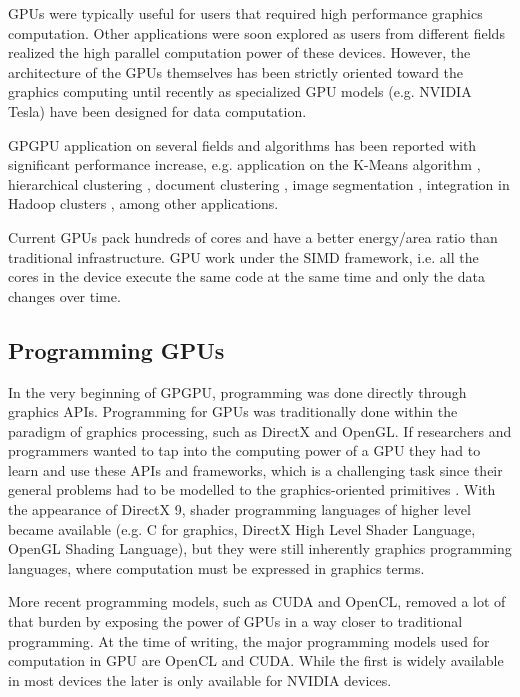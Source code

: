 GPUs were typically useful for users that required high performance graphics computation.
Other applications were soon explored as users from different fields realized the high parallel computation power of these devices.
However, the architecture of the GPUs themselves has been strictly oriented toward the graphics computing until recently as specialized GPU models (e.g. NVIDIA Tesla) have been designed for data computation.

GPGPU application on several fields and algorithms has been reported with significant performance increase, e.g. application on the K-Means algorithm \cite{Bai2009,Wu2011,Zechner2009,Wu2009a}, hierarchical clustering \cite{Shalom2009,ArulShalom2011}, document clustering \cite{gao20xx}, image segmentation \cite{Sirotkovi2012}, integration in Hadoop clusters \cite{Malakar2013,Grossman2013}, among other applications.

Current GPUs pack hundreds of cores and have a better energy/area ratio than traditional infrastructure.
GPU work under the SIMD framework, i.e. all the cores in the device execute the same code at the same time and only the data changes over time.

\subsection{Programming GPUs}

In the very beginning of GPGPU, programming was done directly through graphics APIs.
Programming for GPUs was traditionally done within the paradigm of graphics processing, such as DirectX and OpenGL.
If researchers and programmers wanted to tap into the computing power of a GPU they had to learn and use these APIs and frameworks, which is a challenging task since their general problems had to be modelled to the graphics-oriented primitives \cite{Misi2012}.
With the appearance of DirectX 9, shader programming languages of higher level became available (e.g. C for graphics, DirectX High Level Shader Language, OpenGL Shading Language), but they were still inherently graphics programming languages, where computation must be expressed in graphics terms. 

More recent programming models, such as CUDA and OpenCL, removed a lot of that burden by exposing the power of GPUs in a way closer to traditional programming.
At the time of writing, the major programming models used for computation in GPU are OpenCL and CUDA.
While the first is widely available in most devices the later is only available for NVIDIA devices.

